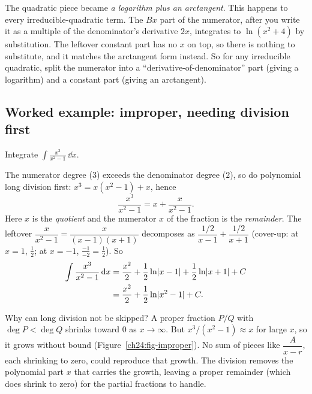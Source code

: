 \begin{happeningbox}
The quadratic piece became \emph{a logarithm plus an arctangent}. This happens
to every irreducible-quadratic term. The $Bx$ part of the
numerator, after you write it as a multiple of the denominator's derivative
$2x$, integrates to $\ln(x^2+4)$ by substitution. The leftover constant part
has no $x$ on top, so there is nothing to substitute, and it matches the
arctangent form instead. So for any irreducible quadratic, split the numerator
into a ``derivative-of-denominator'' part (giving a logarithm) and a constant
part (giving an arctangent).
\end{happeningbox}

\subsection{Worked example: improper, needing division first}

\begin{example}
\label{ch24:ex-improper}
Integrate $\displaystyle \int \frac{x^3}{x^2 - 1}\,\dd x.$
\end{example}

The numerator degree ($3$) exceeds the denominator degree ($2$), so do
polynomial long division first: $x^3 = x(x^2-1) + x$, hence
\[
\frac{x^3}{x^2-1} = x + \frac{x}{x^2-1}.
\]
Here $x$ is the \emph{quotient} and the numerator $x$ of the fraction is the
\emph{remainder}. The leftover $\dfrac{x}{x^2-1} = \dfrac{x}{(x-1)(x+1)}$ decomposes as
$\dfrac{1/2}{x-1} + \dfrac{1/2}{x+1}$ (cover-up: at $x=1$, $\tfrac{1}{2}$; at
$x=-1$, $\tfrac{-1}{-2} = \tfrac{1}{2}$). So
\begin{align*}
\int \frac{x^3}{x^2-1}\,\mathrm{d} x
&= \frac{x^2}{2} + \frac{1}{2}\ln\lvert x-1\rvert + \frac{1}{2}\ln\lvert x+1\rvert + C\\
&= \frac{x^2}{2} + \frac{1}{2}\ln\lvert x^2-1\rvert + C.
\end{align*}

\begin{walkbox}
Why can long division not be skipped? A proper fraction
$P/Q$ with $\deg P < \deg Q$ shrinks toward $0$ as $x\to\infty$. But
$x^3/(x^2-1) \approx x$ for large $x$, so it grows without bound
(Figure~\ref{ch24:fig-improper}). No sum of pieces like $\dfrac{A}{x-r}$, each
shrinking to zero, could reproduce that growth. The division removes the
polynomial part $x$ that carries the growth, leaving a proper remainder (which
does shrink to zero) for the partial fractions to handle.
\end{walkbox}


